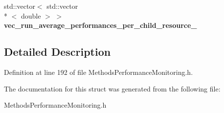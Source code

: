 \begin{DoxyCompactItemize}
\item 
\hypertarget{structStruct__PerformanceMonitoring_aba51ce2ae3d06715b36bb88676cff5ff}{std\-::vector$<$ std\-::vector\\*
$<$ double $>$ $>$ {\bfseries vec\-\_\-run\-\_\-average\-\_\-performances\-\_\-per\-\_\-child\-\_\-resource\-\_\-}}\label{structStruct__PerformanceMonitoring_aba51ce2ae3d06715b36bb88676cff5ff}

\end{DoxyCompactItemize}


\subsection{Detailed Description}


Definition at line 192 of file Methods\-Performance\-Monitoring.\-h.



The documentation for this struct was generated from the following file\-:\begin{DoxyCompactItemize}
\item 
Methods\-Performance\-Monitoring.\-h\end{DoxyCompactItemize}
